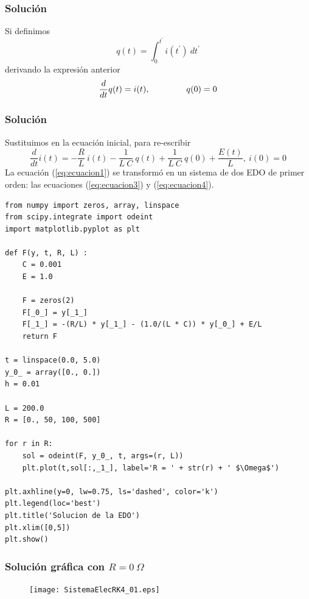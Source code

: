 \begin{frame}
\frametitle{Solución}
Si definimos
\begin{equation}\label{eq:ecuacion2}
    q(t) = \int_{0}^{t^{\prime}} i(t^{\prime}) \: dt^{\prime}
\end{equation}
derivando la expresión anterior
\begin{equation}\label{eq:ecuacion3}
    \dfrac{d}{dt}q(t) = i(t), \hspace{1.5cm} q(0)=0
\end{equation}
\end{frame}
\begin{frame}
\frametitle{Solución}
Sustituimos en la ecuación inicial, para re-escribir
{\fontsize{12}{12}\selectfont
\begin{equation}\label{eq:ecuacion4}
    \dfrac{d}{dt}i(t) = -\dfrac{R}{L} \: i(t) - \dfrac{1}{L \: C} \: q(t) + \dfrac{1}{L \: C} \: q(0) + \dfrac{E(t)}{L}, \: i(0) =  0 
\end{equation}}
La ecuación (\ref{eq:ecuacion1}) se transformó en un sistema de dos EDO de primer orden: las ecuaciones (\ref{eq:ecuacion3}) y (\ref{eq:ecuacion4}).
\end{frame}
\begin{frame}
\begin{lstlisting}[caption=Código para el circuito, style=FormattedNumber, basicstyle=\linespread{1.1}\ttfamily=\small, columns=fullflexible]
from numpy import zeros, array, linspace
from scipy.integrate import odeint
import matplotlib.pyplot as plt

def F(y, t, R, L) : 
    C = 0.001
    E = 1.0
            
    F = zeros(2)
    F[_0_] = y[_1_]
    F[_1_] = -(R/L) * y[_1_] - (1.0/(L * C)) * y[_0_] + E/L
    return F

t = linspace(0.0, 5.0)
y_0_ = array([0., 0.])
h = 0.01

L = 200.0
R = [0., 50, 100, 500]

for r in R:
    sol = odeint(F, y_0_, t, args=(r, L))
    plt.plot(t,sol[:,_1_], label='R = ' + str(r) + ' $\Omega$')

plt.axhline(y=0, lw=0.75, ls='dashed', color='k')
plt.legend(loc='best')
plt.title('Solucion de la EDO')
plt.xlim([0,5])
plt.show()
\end{lstlisting}
\end{frame}
\begin{frame}[plain]
\frametitle{Solución gráfica con $R = 0 \: \Omega$}
\begin{figure}
    \centering
    \texttt{[image: SistemaElecRK4\_01.eps]} 
\end{figure}
\end{frame}
